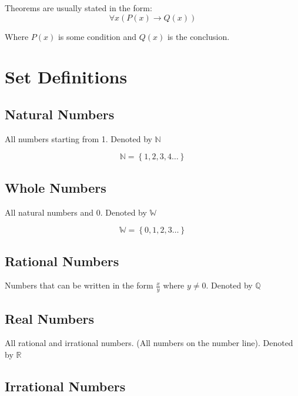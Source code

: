 \documentclass[12pt letter]{report}
\begin{document}



\noindent Theorems are usually stated in the form:
\[
  \forall x \left( P \left( x \right) \to  Q \left( x \right)   \right)
\]

\noindent Where $P \left( x \right) $ is some condition and $Q \left( x \right) $ is the conclusion.

\section{Set Definitions}

\subsection{Natural Numbers}

All numbers starting from 1. Denoted by $\mathbb{N}$

\[
  \mathbb{N} = \left\{ 1,2,3,4\ldots \right\}
\]

\subsection{Whole Numbers}

All natural numbers and 0. Denoted by $\mathbb{W}$

\[
  \mathbb{W} = \left\{ 0,1,2,3\dots \right\}
\]

\subsection{Rational Numbers}

Numbers that can be written in the form $\frac{x}{y}$ where $y \neq 0$. Denoted by $\mathbb{Q}$

\subsection{Real Numbers}

All rational and irrational numbers. (All numbers on the number line). Denoted by $\mathbb{R}$

\subsection{Irrational Numbers}
\end{document}
